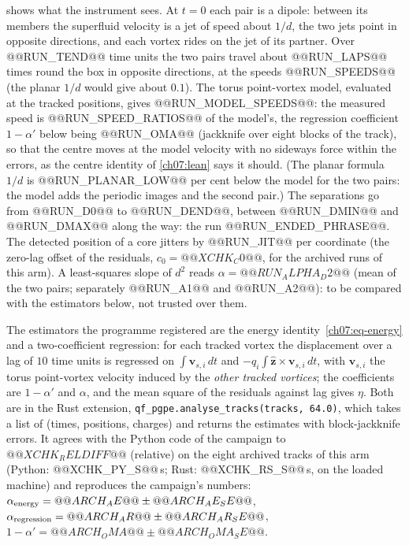  shows what the instrument sees. At $t=0$ each pair is a dipole: between its members the superfluid velocity is a jet of speed about $1/d$, the two jets point in opposite directions, and each vortex rides on the jet of its partner. Over @@RUN_TEND@@ time units the two pairs travel about @@RUN_LAPS@@ times round the box in opposite directions, at the speeds @@RUN_SPEEDS@@ (the planar $1/d$ would give about $0.1$). The torus point-vortex model, evaluated at the tracked positions, gives @@RUN_MODEL_SPEEDS@@: the measured speed is @@RUN_SPEED_RATIOS@@ of the model's, the regression coefficient $1-\alpha'$ below being @@RUN_OMA@@ (jackknife over eight blocks of the track), so that the centre moves at the model velocity with no sideways force within the errors, as the centre identity of \cref{ch07:lean} says it should. (The planar formula $1/d$ is @@RUN_PLANAR_LOW@@ per cent below the model for the two pairs: the model adds the periodic images and the second pair.) The separations go from @@RUN_D0@@ to @@RUN_DEND@@, between @@RUN_DMIN@@ and @@RUN_DMAX@@ along the way: the run @@RUN_ENDED_PHRASE@@. The detected position of a core jitters by @@RUN_JIT@@ per coordinate (the zero-lag offset of the residuals, $c_0=@@XCHK_C0@@$, for the archived runs of this arm).
A least-squares slope of $d^2$ reads $\alpha=@@RUN_ALPHA_D2@@$ (mean of the two pairs; separately @@RUN_A1@@ and @@RUN_A2@@): to be compared with the estimators below, not trusted over them.

The estimators the programme registered are the energy identity~\eqref{ch07:eq-energy} and a two-coefficient regression: for each tracked vortex the displacement over a lag of $10$ time units is regressed on $\int\mathbf v_{s,i}\,dt$ and $-q_i\!\int\hat{\mathbf z}\times\mathbf v_{s,i}\,dt$, with $\mathbf v_{s,i}$ the torus point-vortex velocity induced by the \emph{other tracked vortices}; the
coefficients are $1-\alpha'$ and $\alpha$, and the mean square of the residuals against lag gives $\eta$. Both are in the Rust extension, \texttt{qf\_pgpe.analyse\_tracks(tracks, 64.0)}, which takes a list of (times, positions, charges) and returns the estimates with block-jackknife errors. It agrees with the Python code of the campaign to $@@XCHK_RELDIFF@@$ (relative) on the eight archived tracks
of this arm (Python: @@XCHK_PY_S@@\,s; Rust: @@XCHK_RS_S@@\,s, on the loaded machine) and reproduces the campaign's numbers: $\alpha_{\rm energy}=@@ARCH_AE@@\pm@@ARCH_AE_SE@@$, $\alpha_{\rm regression}=@@ARCH_AR@@\pm@@ARCH_AR_SE@@$, $1-\alpha'=@@ARCH_OMA@@\pm@@ARCH_OMA_SE@@$.

